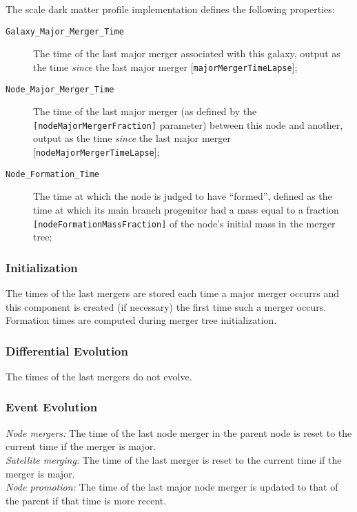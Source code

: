 The scale dark matter profile implementation defines the following properties:
\begin{description}
 \item [{\tt Galaxy\_Major\_Merger\_Time}] The time of the last major merger associated with this galaxy, output as the time \emph{since} the last major merger [{\tt majorMergerTimeLapse}];
 \item [{\tt Node\_Major\_Merger\_Time}] The time of the last major merger (as defined by the {\tt [nodeMajorMergerFraction]} parameter) between this \gls{node} and another, output as the time \emph{since} the last major merger [{\tt nodeMajorMergerTimeLapse}];
 \item [{\tt Node\_Formation\_Time}] The time at which the \gls{node} is judged to have ``formed'', defined as the time at which its main branch progenitor had a mass equal to a fraction {\tt [nodeFormationMassFraction]} of the node's initial mass in the merger tree;
\end{description}

\subsubsection{Initialization}

The times of the last mergers are stored each time a major merger occurrs and this \gls{component} is created (if necessary) the first time such a merger occurs. Formation times are computed during merger tree initialization.

\subsubsection{Differential Evolution}

The times of the last mergers do not evolve.

\subsubsection{Event Evolution}

\noindent\emph{Node mergers:} The time of the last \gls{node} merger in the parent \gls{node} is reset to the current time if the merger is major.\\

\noindent\emph{Satellite merging:} The time of the last merger is reset to the current time if the merger is major.\\

\noindent\emph{Node promotion:} The time of the last major \gls{node} merger is updated to that of the parent if that time is more recent.\\

